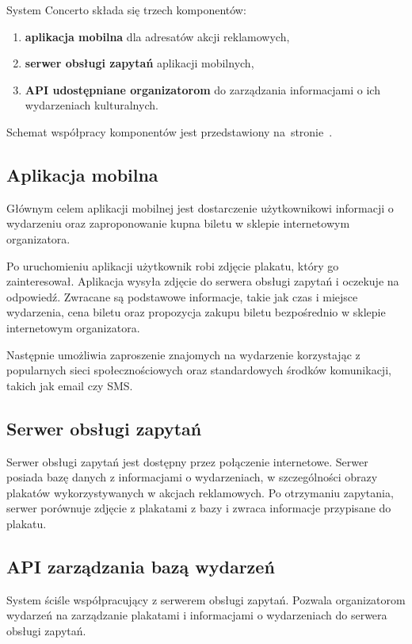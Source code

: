 \documentclass[10pt]{dokument-ppi}
\begin{document}
System Concerto składa się trzech komponentów:
\begin{enumerate}
    \item \textbf{aplikacja mobilna} dla adresatów akcji reklamowych,
    \item \textbf{serwer obsługi zapytań} aplikacji mobilnych,
    \item \textbf{API udostępniane organizatorom} do zarządzania informacjami o
        ich wydarzeniach kulturalnych.
\end{enumerate}
Schemat współpracy komponentów jest przedstawiony
na~stronie~\pageref{fig:schemat_komponentow}.

\subsection{Aplikacja mobilna}
Głównym celem aplikacji mobilnej jest dostarczenie użytkownikowi informacji o
wydarzeniu oraz zaproponowanie kupna biletu w sklepie internetowym organizatora.

Po uruchomieniu aplikacji użytkownik robi zdjęcie plakatu, który go
zainteresował. Aplikacja wysyła zdjęcie do serwera obsługi zapytań i oczekuje na
odpowiedź. Zwracane są podstawowe informacje, takie jak czas i miejsce
wydarzenia, cena biletu oraz propozycja zakupu biletu bezpośrednio w sklepie
internetowym organizatora.

Następnie umożliwia zaproszenie znajomych na wydarzenie korzystając z
popularnych sieci społecznościowych oraz standardowych środków komunikacji,
takich jak email czy SMS.

\subsection{Serwer obsługi zapytań}
Serwer obsługi zapytań jest dostępny przez połączenie internetowe. Serwer
posiada bazę danych z informacjami o wydarzeniach, w szczególności obrazy
plakatów wykorzystywanych w akcjach reklamowych. Po otrzymaniu zapytania,
serwer porównuje zdjęcie z plakatami z bazy i zwraca informacje przypisane do
plakatu.

\subsection{API zarządzania bazą wydarzeń}
System ściśle współpracujący z serwerem obsługi zapytań. Pozwala organizatorom
wydarzeń na zarządzanie plakatami i informacjami o wydarzeniach do serwera
obsługi zapytań.
\end{document}
